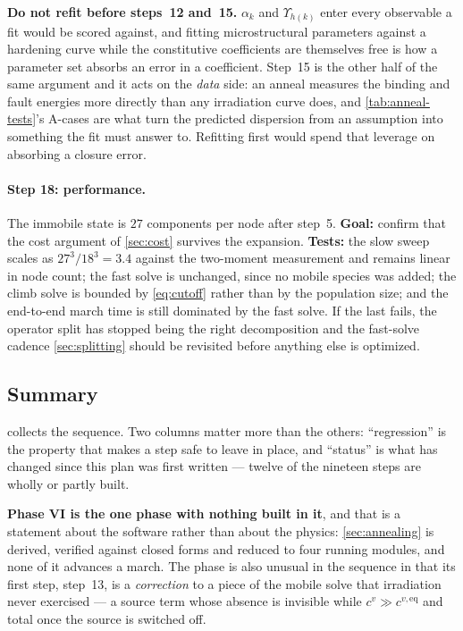 \documentclass{article}
\begin{document}
\textbf{Do not refit before steps~12 and~15.} $\alpha_k$ and $\Upsilon_{h(k)}$
enter every observable a fit would be scored against, and fitting microstructural
parameters against a hardening curve while the constitutive coefficients are
themselves free is how a parameter set absorbs an error in a coefficient. Step~15
is the other half of the same argument and it acts on the \emph{data} side:
an anneal measures the binding and fault energies more directly than any
irradiation curve does, and \cref{tab:anneal-tests}'s A-cases are what turn the
predicted dispersion from an assumption into something the fit must answer to.
Refitting first would spend that leverage on absorbing a closure error.

\paragraph{Step 18: performance.} The immobile state is $27$ components per node
after step~5. \textbf{Goal:} confirm that the cost argument of \cref{sec:cost}
survives the expansion. \textbf{Tests:} the slow sweep scales as
$27^3/18^3=3.4$ against the two-moment measurement and remains linear in node
count; the fast solve is unchanged, since no mobile species was added; the climb
solve is bounded by \cref{eq:cutoff} rather than by the population size; and the
end-to-end march time is still dominated by the fast solve. If the last fails,
the operator split has stopped being the right decomposition and the fast-solve
cadence \cref{sec:splitting} should be revisited before anything else is
optimized.

\subsection{Summary}

 collects the sequence. Two columns matter more than the others:
``regression'' is the property that makes a step safe to leave in place, and
``status'' is what has changed since this plan was first written --- twelve of the
nineteen steps are wholly or partly built.

\textbf{Phase VI is the one phase with nothing built in it}, and that is a
statement about the software rather than about the physics: \cref{sec:annealing}
is derived, verified against closed forms and reduced to four running modules, and
none of it advances a march. The phase is also unusual in the sequence in that its
first step, step~13, is a \emph{correction} to a piece of the mobile solve that
irradiation never exercised --- a source term whose absence is invisible while
$c^v\gg c^{v,\mathrm{eq}}$ and total once the source is switched off.
\end{document}
